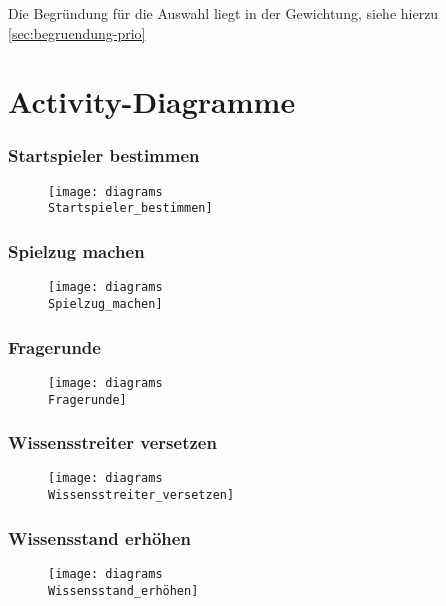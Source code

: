 Die Begründung für die Auswahl liegt in der Gewichtung, siehe hierzu \ref{sec:begruendung-prio}


\section{Activity-Diagramme}
\subsubsection{Startspieler bestimmen}
\begin{figure}[h]
  \begin{center}
    \texttt{[image: diagrams\\Startspieler\_bestimmen]}
  \end{center}
\end{figure}

\subsubsection{Spielzug machen}
\begin{figure}[h]
  \begin{center}
    \texttt{[image: diagrams\\Spielzug\_machen]}
  \end{center}
\end{figure}

\subsubsection{Fragerunde}
\begin{figure}[h]
  \begin{center}
    \texttt{[image: diagrams\\Fragerunde]}
  \end{center}
\end{figure}

\subsubsection{Wissensstreiter versetzen}
\begin{figure}[h]
  \begin{center}
    \texttt{[image: diagrams\\Wissensstreiter\_versetzen]}
  \end{center}
\end{figure}

\subsubsection{Wissensstand erhöhen}
\begin{figure}[h]
  \begin{center}
    \texttt{[image: diagrams\\Wissensstand\_erhöhen]}
  \end{center}
\end{figure}




